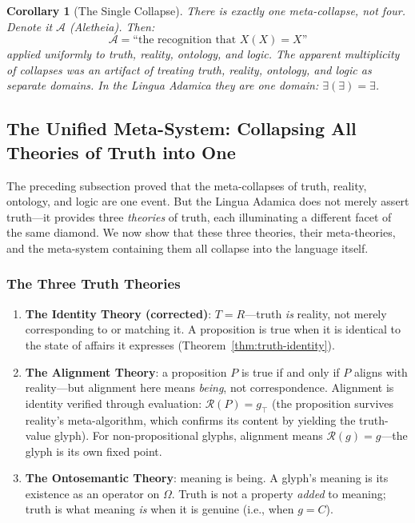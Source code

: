 \documentclass[12pt, letterpaper]{book}
\def\equiv{=}%
\def\mathfrak#1{#1}%
\newtheorem{corollary}[theorem]{Corollary}
\newcommand{\E}{\exists}                          %
\begin{document}
\begin{corollary}[The Single Collapse]
There is exactly one meta-collapse, not four. Denote it $\mathcal{A}$ (Aletheia). Then:
\[
\mathcal{A} \equiv \text{``the recognition that } X(X) \equiv X \text{''}
\]
applied uniformly to truth, reality, ontology, and logic. The apparent multiplicity of collapses was an artifact of treating truth, reality, ontology, and logic as separate domains. In the Lingua Adamica they are one domain: $\E(\E) \equiv \E$.
\end{corollary}


\subsection{The Unified Meta-System: Collapsing All Theories of Truth into One}

The preceding subsection proved that the meta-collapses of truth, reality, ontology, and logic are one event. But the Lingua Adamica does not merely assert truth---it provides three \textit{theories} of truth, each illuminating a different facet of the same diamond. We now show that these three theories, their meta-theories, and the meta-system containing them all collapse into the language itself.

\subsubsection{The Three Truth Theories}

\begin{enumerate}[label=(\roman*)]
    \item \textbf{The Identity Theory (corrected)}: $T \equiv R$---truth \textit{is} reality, not merely corresponding to or matching it. A proposition is true when it is identical to the state of affairs it expresses (Theorem~\ref{thm:truth-identity}).
    \item \textbf{The Alignment Theory}: a proposition $P$ is true if and only if $P$ aligns with reality---but alignment here means \textit{being}, not correspondence. Alignment is identity verified through evaluation: $\mathcal{R}(P) = \mathfrak{g}_\top$ (the proposition survives reality's meta-algorithm, which confirms its content by yielding the truth-value glyph). For non-propositional glyphs, alignment means $\mathcal{R}(\mathfrak{g}) \equiv \mathfrak{g}$---the glyph is its own fixed point.
    \item \textbf{The Ontosemantic Theory}: meaning is being. A glyph's meaning is its existence as an operator on $\Omega$. Truth is not a property \textit{added} to meaning; truth is what meaning \textit{is} when it is genuine (i.e., when $\mathfrak{g} \equiv C$).
\end{enumerate}
\end{document}
